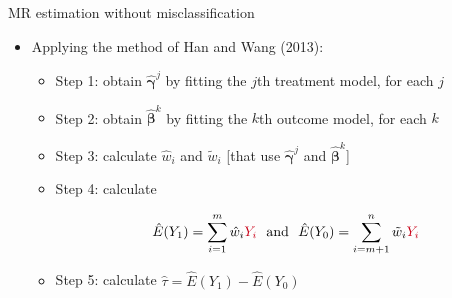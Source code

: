 \documentclass[12pt,aspectratio=169]{beamer}
\begin{document}
\begin{frame}{MR estimation without misclassification}
\begin{itemize}


\item  Applying the method of Han and Wang (2013):

\begin{itemize}
\item 

Step 1: obtain $\hat{\boldsymbol\gamma}^j$ by fitting the $j$th treatment model, for each $j$

\item \colorbox{blue!10}{Step 2}: obtain $\hat{\boldsymbol\beta}^k$ by fitting the $k$th \colorbox{blue!10}{outcome} model, for each $k$

\item Step 3: calculate  $\hat w_i$  and  $\tilde w_i$ [that use $\hat{\boldsymbol\gamma}^j$ and $\hat{\boldsymbol\beta}^k$]

\item \colorbox{blue!10}{Step 4}:  calculate


\[
\,\, \hat E(Y_1)=\sum_{i=1}^m \hat w_i{\color{cred}Y_i}
\,\,\,\,
\text{and}
\,\,\,\,
\hat E(Y_0)=\sum_{i=m+1}^{n}  \tilde w_i {\color{cred}Y_i}
\]

\item Step 5:  calculate $\hat\tau=\hat E(Y_1)-\hat E(Y_0)$

\end{itemize}


\end{itemize}

\end{frame}
\end{document}
